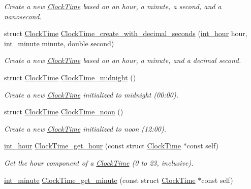 \begin{DoxyCompactItemize}
\begin{DoxyCompactList}\small\item\em \-Create a new \hyperlink{structClockTime}{\-Clock\-Time} based on an hour, a minute, a second, and a nanosecond. \end{DoxyCompactList}\item 
struct \hyperlink{structClockTime}{\-Clock\-Time} \hyperlink{clock-time_8h_a519b7c6074cf1addc815f7495048c30b}{\-Clock\-Time\-\_\-create\-\_\-with\-\_\-decimal\-\_\-seconds} (\hyperlink{types_8h_a62ed583cd6a13da9650111e3b4b4eedc}{int\-\_\-hour} hour, \hyperlink{types_8h_a3e55debfc84cabacf28bddf2d04984c9}{int\-\_\-minute} minute, double second)
\begin{DoxyCompactList}\small\item\em \-Create a new \hyperlink{structClockTime}{\-Clock\-Time} based on an hour, a minute, and a decimal second. \end{DoxyCompactList}\item 
struct \hyperlink{structClockTime}{\-Clock\-Time} \hyperlink{clock-time_8h_ae320c2e30dedf0b33d5306b9e8841261}{\-Clock\-Time\-\_\-midnight} ()
\begin{DoxyCompactList}\small\item\em \-Create a new \hyperlink{structClockTime}{\-Clock\-Time} initialized to midnight (00\-:00). \end{DoxyCompactList}\item 
struct \hyperlink{structClockTime}{\-Clock\-Time} \hyperlink{clock-time_8h_a183049a7386a7b7377ba3059d15485c4}{\-Clock\-Time\-\_\-noon} ()
\begin{DoxyCompactList}\small\item\em \-Create a new \hyperlink{structClockTime}{\-Clock\-Time} initialized to noon (12\-:00). \end{DoxyCompactList}\item 
\hyperlink{types_8h_a62ed583cd6a13da9650111e3b4b4eedc}{int\-\_\-hour} \hyperlink{clock-time_8h_a1688a98fb161dc7a743085b09cb3c1de}{\-Clock\-Time\-\_\-get\-\_\-hour} (const struct \hyperlink{structClockTime}{\-Clock\-Time} $\ast$const self)
\begin{DoxyCompactList}\small\item\em \-Get the hour component of a \hyperlink{structClockTime}{\-Clock\-Time} (0 to 23, inclusive). \end{DoxyCompactList}\item 
\hyperlink{types_8h_a3e55debfc84cabacf28bddf2d04984c9}{int\-\_\-minute} \hyperlink{clock-time_8h_a3ea78f71041658c2f9530c3603b7b9ec}{\-Clock\-Time\-\_\-get\-\_\-minute} (const struct \hyperlink{structClockTime}{\-Clock\-Time} $\ast$const self)

\end{DoxyCompactItemize}
